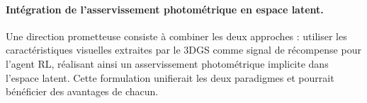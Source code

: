 \paragraph{Intégration de l'asservissement photométrique en espace 
latent.}
Une direction prometteuse consiste à combiner les deux approches : 
utiliser les caractéristiques visuelles extraites par le 3DGS comme 
signal de récompense pour l'agent RL, réalisant ainsi un asservissement 
photométrique implicite dans l'espace latent. Cette formulation 
unifierait les deux paradigmes et pourrait bénéficier des avantages 
de chacun.


